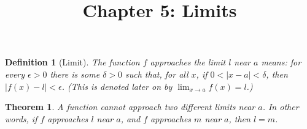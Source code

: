 \documentclass{article}
\newtheorem{definition}{Definition}
\newtheorem{theorem}{Theorem}
\begin{document}
\title{Chapter 5: Limits}
\maketitle

\begin{definition}[Limit]
  The function \emph{$f$ approaches the limit $l$ near $a$} means: for every
  $\epsilon > 0$ there is some $\delta > 0$ such that, for all $x$, if $0 < |x
  - a| < \delta$, then $|f(x) - l| < \epsilon$. (This is denoted later on by
  $\lim_{x \rightarrow a} f(x) = l$.)
\end{definition}

\begin{theorem}
  A function cannot approach two different limits near $a$. In other words, if
  $f$ approaches $l$ near $a$, and $f$ approaches $m$ near $a$, then $l = m$.
\end{theorem}
\end{document}
